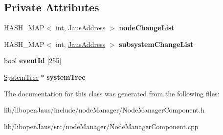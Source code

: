\subsection*{\-Private \-Attributes}
\begin{DoxyCompactItemize}
\item 
\hypertarget{class_node_manager_component_a17212f2db18c032a4f6a10cb88f00bcd}{\-H\-A\-S\-H\-\_\-\-M\-A\-P$<$ int, \hyperlink{struct_jaus_address_struct}{\-Jaus\-Address} $>$ {\bfseries node\-Change\-List}}\label{class_node_manager_component_a17212f2db18c032a4f6a10cb88f00bcd}

\item 
\hypertarget{class_node_manager_component_a00165b61cfb9278d985b17a8c9ca897d}{\-H\-A\-S\-H\-\_\-\-M\-A\-P$<$ int, \hyperlink{struct_jaus_address_struct}{\-Jaus\-Address} $>$ {\bfseries subsystem\-Change\-List}}\label{class_node_manager_component_a00165b61cfb9278d985b17a8c9ca897d}

\item 
\hypertarget{class_node_manager_component_a3e59c05aefc9920e4bad8b0113da7c1f}{bool {\bfseries event\-Id} \mbox{[}255\mbox{]}}\label{class_node_manager_component_a3e59c05aefc9920e4bad8b0113da7c1f}

\item 
\hypertarget{class_node_manager_component_a554b28eee83f2150211489879145e3cb}{\hyperlink{class_system_tree}{\-System\-Tree} $\ast$ {\bfseries system\-Tree}}\label{class_node_manager_component_a554b28eee83f2150211489879145e3cb}

\end{DoxyCompactItemize}


\-The documentation for this class was generated from the following files\-:\begin{DoxyCompactItemize}
\item 
lib/libopen\-Jaus/include/node\-Manager/\-Node\-Manager\-Component.\-h\item 
lib/libopen\-Jaus/src/node\-Manager/\-Node\-Manager\-Component.\-cpp\end{DoxyCompactItemize}
